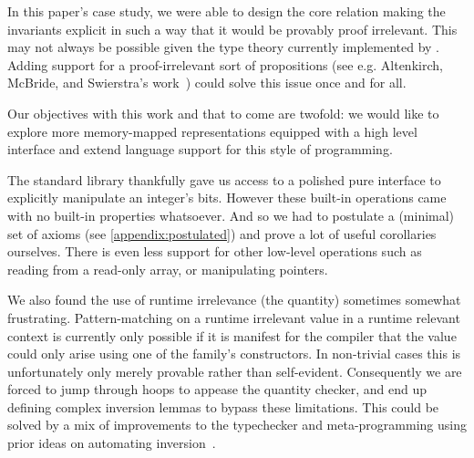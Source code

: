 In this paper's case study, we were able to design the core 
relation making the invariants explicit in such a way that it would be provably
proof irrelevant.
%
This may not always be possible given the type theory currently implemented by
\idris{}. Adding support for a proof-irrelevant sort of propositions (see e.g.
Altenkirch, McBride, and Swierstra's work~\cite{DBLP:conf/plpv/AltenkirchMS07})
could solve this issue once and for all.

Our objectives with this work and that to come are twofold: we would like to
explore more memory-mapped representations equipped with a high level interface
and extend language support for this style of programming.

The \idris{} standard library thankfully gave us access to a polished pure interface
to explicitly manipulate an integer's bits.
%
However these built-in operations came with no built-in properties whatsoever.
%
And so we had to postulate a (minimal) set of axioms (see \cref{appendix:postulated})
and prove a lot of useful corollaries ourselves.
%
There is even less support for other low-level operations such as reading from
a read-only array, or manipulating pointers.

We also found the use of runtime irrelevance (the  quantity)
sometimes somewhat frustrating.
%
Pattern-matching on a runtime irrelevant value in a runtime relevant context
is currently only possible if it is manifest for the compiler that the value
could only arise using one of the family's constructors.
%
In non-trivial cases this is unfortunately only merely provable rather than
self-evident.
%
Consequently we are forced to jump through hoops to appease the quantity
checker, and end up defining complex inversion lemmas to bypass these
limitations.
%
This could be solved by a mix of improvements to the typechecker and
meta-programming using prior ideas on automating
inversion~\cite{DBLP:conf/types/CornesT95,DBLP:conf/types/McBride96,monin:inria-00489412}.
